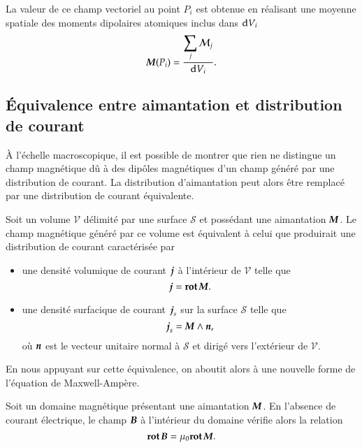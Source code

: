 La valeur de ce champ vectoriel au point $P_i$ est obtenue en réalisant une
moyenne spatiale des moments dipolaires atomiques inclus dans $\mathrm{d}V_i$
\begin{equation*}
	\vecM(P_i) = \dfrac{\displaystyle{\sum_j \mathcal{M}_j}}{\dV_i}.
\end{equation*}

\subsection{Équivalence entre aimantation et distribution de courant}
À l'échelle macroscopique, il est possible de montrer que rien ne distingue 
un champ magnétique dû à des dipôles magnétiques d'un champ généré par une distribution de
courant. La distribution d'aimantation peut alors être remplacé par une distribution de 
courant équivalente.

Soit un volume $\mathcal{V}$ délimité par une surface $\mathcal{S}$ et
possédant une aimantation $\vecM$. Le champ magnétique généré par ce volume
est équivalent à celui que produirait une distribution de courant caractérisée
par
\begin{itemize}
	\item une densité volumique de courant $\vecj$ à l'intérieur
	  de $\mathcal{V}$ telle que
	  \begin{equation}
		  \vecj = \rot \vecM.
	  \end{equation}
       \item une densité surfacique de courant $\vecj_s$ sur la surface
	 $\mathcal{S}$ telle que
	 \begin{equation}
		 \vecj_s = \vecM \wedge \vecn,
	\end{equation}
	où $\vecn$ est le vecteur unitaire normal à $\mathcal{S}$ et dirigé
	vers l'extérieur de $\mathcal{V}$.
\end{itemize}

En nous appuyant sur cette équivalence, on aboutit alors à une
nouvelle forme de l'équation de Maxwell-Ampère.

\begin{defn}
	Soit un domaine magnétique présentant une aimantation $\vecM$. En l'absence
	de courant électrique, le champ
	$\vecb$ à l'intérieur du domaine vérifie alors la relation
	\begin{equation}
		\rot \vecb = \mu_0 \rot \vecM.
	\end{equation}
\end{defn}


